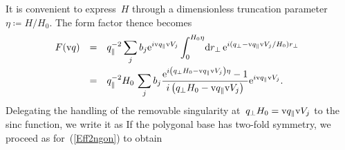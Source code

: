 It is convenient to express~$H$ through
a dimensionless truncation parameter~$\eta\coloneqq H/H_0$.
The form factor thence becomes
\begin{equation}
  \begin{array}{@{}lcl}
  F(\q)
  &=& \displaystyle
      q_\parallel^{-2}  \sum_j b_j \e^{i\q_\parallel \V_j}
      \int_0^{H_0\eta}\!\d r_\perp\,\e^{i(q_\perp-\q_\parallel \V_j/H_0)r_\perp}
\\[3ex]
  &=& \displaystyle
       q_\parallel^{-2} H_0\, \sum_j b_j
          \frac{\e^{i\left(q_\perp H_0-\q_\parallel\V_j\right)\eta}-1}
               {i\left(q_\perp H_0 - \q_\parallel\V_j\right)}
               \e^{i\q_\parallel \V_j}.
  \end{array}
\end{equation}
Delegating the handling of the removable singularity at~$q_\perp H_0=\text{v}{q}_\parallel\text{v}{V}_j$
to the sinc function,
we write it as
If the polygonal base has two-fold symmetry, we proceed as for~(\ref{Eff2ngon})
to obtain

%
%
%
%

\iffalse
\section{Special functions near the removable singularity}

\index{Machine epsilon}
We assume a double-precision machine epsilon
of $\epsilon=2^{-52}\simeq2.2\cdot10^{-16}$.

\fi

